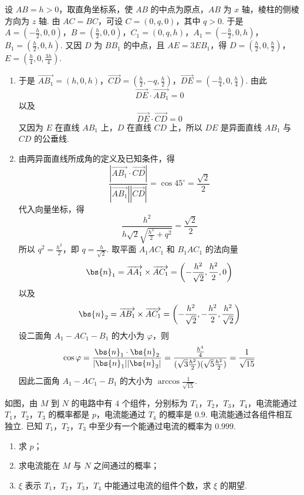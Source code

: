 \begin{solution}
设 \(AB=h>0\)，取直角坐标系，使 \(AB\) 的中点为原点，\(AB\) 为 \(x\) 轴，棱柱的侧棱方向为 \(z\) 轴. 由 \(AC=BC\)，可设 \(C=(0,q,0)\)，其中 \(q>0\). 于是 \(A=\left(-\frac{h}{2},0,0\right)\)，\(B=\left(\frac{h}{2},0,0\right)\)，\(C_1=(0,q,h)\)，\(A_1=\left(-\frac{h}{2},0,h\right)\)，\(B_1=\left(\frac{h}{2},0,h\right)\). 又因 \(D\) 为 \(BB_1\) 的中点，且 \(AE=3EB_1\)，得 \(D=\left(\frac{h}{2},0,\frac{h}{2}\right)\)，\(E=\left(\frac{h}{4},0,\frac{3h}{4}\right)\).

\begin{enumerate}
\item 于是 \(\overrightarrow{AB_1}=(h,0,h)\)，\(\overrightarrow{CD}=\left(\frac{h}{2},-q,\frac{h}{2}\right)\)，\(\overrightarrow{DE}=\left(-\frac{h}{4},0,\frac{h}{4}\right)\). 由此
\[
\overrightarrow{DE}\cdot\overrightarrow{AB_1}=0
\]
以及
\[
\overrightarrow{DE}\cdot\overrightarrow{CD}=0
\]
又因为 \(E\) 在直线 \(AB_1\) 上，\(D\) 在直线 \(CD\) 上，所以 \(DE\) 是异面直线 \(AB_1\) 与 \(CD\) 的公垂线.

\item 由两异面直线所成角的定义及已知条件，得
\[
\frac{\left|\overrightarrow{AB_1}\cdot\overrightarrow{CD}\right|}{\left|\overrightarrow{AB_1}\right|\left|\overrightarrow{CD}\right|}=\cos45^{\circ}=\frac{\sqrt{2}}{2}
\]
代入向量坐标，得
\[
\frac{h^2}{h\sqrt{2}\sqrt{\frac{h^2}{2}+q^2}}=\frac{\sqrt{2}}{2}
\]
所以 \(q^2=\frac{h^2}{2}\)，即 \(q=\frac{h}{\sqrt{2}}\). 取平面 \(A_1AC_1\) 和 \(B_1AC_1\) 的法向量
\[
\bs{n}_1=\overrightarrow{AA_1}\times\overrightarrow{AC_1}=\left(-\frac{h^2}{\sqrt{2}},\frac{h^2}{2},0\right)
\]
以及
\[
\bs{n}_2=\overrightarrow{AB_1}\times\overrightarrow{AC_1}=\left(-\frac{h^2}{\sqrt{2}},-\frac{h^2}{2},\frac{h^2}{\sqrt{2}}\right)
\]
设二面角 \(A_1-AC_1-B_1\) 的大小为 \(\varphi\)，则
\[
\cos\varphi=\frac{\bs{n}_1\cdot\bs{n}_2}{|\bs{n}_1||\bs{n}_2|}=\frac{\frac{h^4}{4}}{(\sqrt{3}\frac{h^2}{2})(\sqrt{5}\frac{h^2}{2})}=\frac{1}{\sqrt{15}}
\]
因此二面角 \(A_1-AC_1-B_1\) 的大小为 \(\arccos\frac{1}{\sqrt{15}}\).
\end{enumerate}
\end{solution}

\begin{problem}
如图，由 \(M\) 到 \(N\) 的电路中有 \(4\) 个组件，分别标为 \(T_{1}\)，\(T_{2}\)，\(T_{3}\)，\(T_{4}\)，电流能通过 \(T_{1}\)，\(T_{2}\)，\(T_{3}\) 的概率都是 \(p\)，电流能通过 \(T_{4}\) 的概率是 \(0.9\). 电流能通过各组件相互独立. 已知 \(T_{1}\)，\(T_{2}\)，\(T_{3}\) 中至少有一个能通过电流的概率为 \(0.999\).
\begin{enumerate}
\item 求 \(p\)；
\item 求电流能在 \(M\) 与 \(N\) 之间通过的概率；
\item \(\xi\) 表示 \(T_{1}\)，\(T_{2}\)，\(T_{3}\)，\(T_{4}\) 中能通过电流的组件个数，求 \(\xi\) 的期望.
\end{enumerate}
\end{problem}

